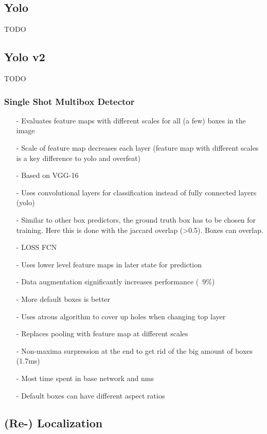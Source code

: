 \documentclass{article}
\begin{document}
\begin{multicols}{2}
		\subsection{Yolo}
		TODO
		\subsection{Yolo v2}
		TODO
			 \subsubsection{Single Shot Multibox Detector \cite{Liu}}
			 \begin{itemize}
			 	\item[-] Evaluates feature maps with different scales for all (a few) boxes in the image
			 	\item[-] Scale of feature map decreases each layer (feature map with different scales is a key difference to yolo and overfeat)
			 	\item[-] Based on VGG-16
			 	\item[-] Uses convolutional layers for classification instead of fully connected layers (yolo)
			 	\item[-] Similar to other box predictors, the ground truth box has to be chosen for training. Here this is done with the jaccard overlap (>0.5). Boxes can overlap.
			 	\item[-] LOSS FCN
			 	\item[-] Uses lower level feature maps in later state for prediction
			 	\item[-] Data augmentation significantly increases performance (~9\%)
			 	\item[-] More default boxes is better
			 	\item[-] Uses atrous algorithm to cover up holes when changing top layer
			 	\item[-] Replaces pooling with feature map at different scales
			 	\item[-] Non-maxima surpression at the end to get rid of the big amount of boxes (1.7ms)
			 	\item[-] Most time spent in base network and nms
			 	\item[-] Default boxes can have different aspect ratios
			 \end{itemize}
	\subsection{(Re-) Localization}

\end{multicols}
\end{document}
